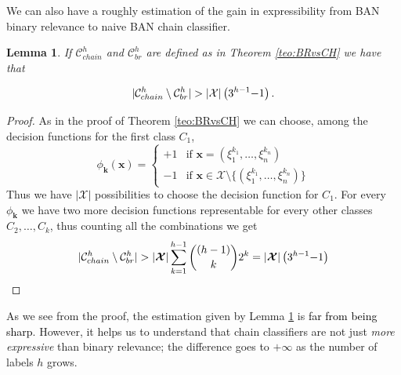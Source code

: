 \documentclass[11pt,a4paper, twoside]{book}
\newtheorem{lemma}{Lemma}[chapter]
\newcommand{\bchi}{\boldsymbol{\mathcal{X}}}
\newcommand{\nchi}{\mathcal{X}}
\begin{document}
We can also have a roughly estimation of the gain in expressibility from BAN binary relevance to naive BAN chain classifier.
\begin{lemma}
If $\mathcal{C}^{h}_{chain}$ and $\mathcal{C}^{h}_{br}$ are defined as in Theorem \ref{teo:BRvsCH} we have that

$$ |\mathcal{C}^{h}_{chain}\setminus\mathcal{C}^{h}_{br}|> |\nchi|\left(3^{h-1 }\textcolor{black}{-1}\right) .$$
\label{lem:bound2}
\end{lemma}
\begin{proof}
As in the proof of Theorem \ref{teo:BRvsCH} we can choose, among the decision functions for the first class $C_1$,
$$ \phi_{\mathbf{k}}(\mathbf{x})=\begin{cases} +1 & \text{if } \mathbf{x}=(\xi_1^{k_1},\ldots,\xi_n^{k_n}) \\
                                            -1 & \text{if } \mathbf{x} \in {\bchi}\setminus \{(\xi_1^{k_1},\ldots,\xi_n^{k_n}) \}
\end{cases}$$
Thus we have \textcolor{black}{$|{\bchi}|$} possibilities to choose the decision function for $C_1$. For every $\phi_{\mathbf{k}}$ we have two more decision functions representable for every other classes $C_2,\ldots,C_k$, thus counting all the combinations we get
$$ |\mathcal{C}^{h}_{chain}\setminus\mathcal{C}^{h}_{br}|> |{\bchi}| \sum_{k=1}^{h-1} {(h-1) \choose k} 2^k=|{\bchi}|\left(3^{h-1} \textcolor{black}{-1}\right) $$   
\end{proof}

As we see from the proof, the estimation given by Lemma \ref{lem:bound2} is \textcolor{black}{far from being sharp}. However, it helps us to understand that chain classifiers are not just\textit{ more expressive} than binary relevance; the difference goes to $+\infty$ as the number of labels $h$ grows.
\end{document}
